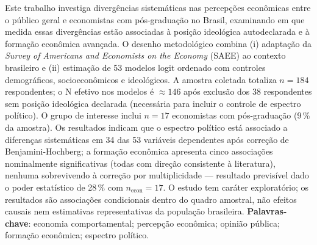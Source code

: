 
\setlength{\absparsep}{18pt} %
\begin{resumo}
    Este trabalho investiga divergências sistemáticas nas percepções econômicas entre o público geral e economistas com pós-graduação no Brasil, examinando em que medida essas divergências estão associadas à posição ideológica autodeclarada e à formação econômica avançada. O desenho metodológico combina (i) adaptação da \textit{Survey of Americans and Economists on the Economy} (SAEE) ao contexto brasileiro e (ii) estimação de 53 modelos logit ordenado com controles demográficos, socioeconômicos e ideológicos. A amostra coletada totaliza $n = 184$ respondentes; o N efetivo nos modelos é $\approx 146$ após exclusão dos 38 respondentes sem posição ideológica declarada (necessária para incluir o controle de espectro político). O grupo de interesse inclui $n = 17$ economistas com pós-graduação (9\,\% da amostra). Os resultados indicam que o espectro político está associado a diferenças sistemáticas em 34 das 53 variáveis dependentes após correção de Benjamini-Hochberg; a formação econômica apresenta cinco associações nominalmente significativas (todas com direção consistente à literatura), nenhuma sobrevivendo à correção por multiplicidade — resultado previsível dado o poder estatístico de 28\,\% com $n_{\text{econ}} = 17$. O estudo tem caráter exploratório; os resultados são associações condicionais dentro do quadro amostral, não efeitos causais nem estimativas representativas da população brasileira.
 \textbf{Palavras-chave}: economia comportamental; percepção econômica; opinião pública; formação econômica; espectro político.
\end{resumo}
